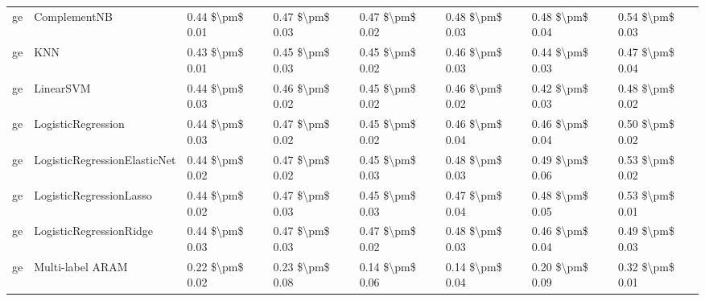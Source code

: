\begin{tabular}{llllllll}
      ge &                    ComplementNB & 0.44 \$\textbackslash pm\$ 0.01 &           0.47 \$\textbackslash pm\$ 0.03 &       0.47 \$\textbackslash pm\$ 0.02 &        0.48 \$\textbackslash pm\$ 0.03 &                         0.48 \$\textbackslash pm\$ 0.04 &     0.54 \$\textbackslash pm\$ 0.03 \\
      ge &                             KNN & 0.43 \$\textbackslash pm\$ 0.01 &           0.45 \$\textbackslash pm\$ 0.03 &       0.45 \$\textbackslash pm\$ 0.02 &        0.46 \$\textbackslash pm\$ 0.03 &                         0.44 \$\textbackslash pm\$ 0.03 &     0.47 \$\textbackslash pm\$ 0.04 \\
      ge &                       LinearSVM & 0.44 \$\textbackslash pm\$ 0.03 &           0.46 \$\textbackslash pm\$ 0.02 &       0.45 \$\textbackslash pm\$ 0.02 &        0.46 \$\textbackslash pm\$ 0.02 &                         0.42 \$\textbackslash pm\$ 0.03 &     0.48 \$\textbackslash pm\$ 0.02 \\
      ge &              LogisticRegression & 0.44 \$\textbackslash pm\$ 0.03 &           0.47 \$\textbackslash pm\$ 0.02 &       0.45 \$\textbackslash pm\$ 0.02 &        0.46 \$\textbackslash pm\$ 0.04 &                         0.46 \$\textbackslash pm\$ 0.04 &     0.50 \$\textbackslash pm\$ 0.02 \\
      ge &    LogisticRegressionElasticNet & 0.44 \$\textbackslash pm\$ 0.02 &           0.47 \$\textbackslash pm\$ 0.02 &       0.45 \$\textbackslash pm\$ 0.03 &        0.48 \$\textbackslash pm\$ 0.03 &                         0.49 \$\textbackslash pm\$ 0.06 &     0.53 \$\textbackslash pm\$ 0.02 \\
      ge &         LogisticRegressionLasso & 0.44 \$\textbackslash pm\$ 0.02 &           0.47 \$\textbackslash pm\$ 0.03 &       0.45 \$\textbackslash pm\$ 0.03 &        0.47 \$\textbackslash pm\$ 0.04 &                         0.48 \$\textbackslash pm\$ 0.05 &     0.53 \$\textbackslash pm\$ 0.01 \\
      ge &         LogisticRegressionRidge & 0.44 \$\textbackslash pm\$ 0.03 &           0.47 \$\textbackslash pm\$ 0.03 &       0.47 \$\textbackslash pm\$ 0.02 &        0.48 \$\textbackslash pm\$ 0.03 &                         0.46 \$\textbackslash pm\$ 0.04 &     0.49 \$\textbackslash pm\$ 0.03 \\
      ge &                Multi-label ARAM & 0.22 \$\textbackslash pm\$ 0.02 &           0.23 \$\textbackslash pm\$ 0.08 &       0.14 \$\textbackslash pm\$ 0.06 &        0.14 \$\textbackslash pm\$ 0.04 &                         0.20 \$\textbackslash pm\$ 0.09 &     0.32 \$\textbackslash pm\$ 0.01 \\

\end{tabular}
